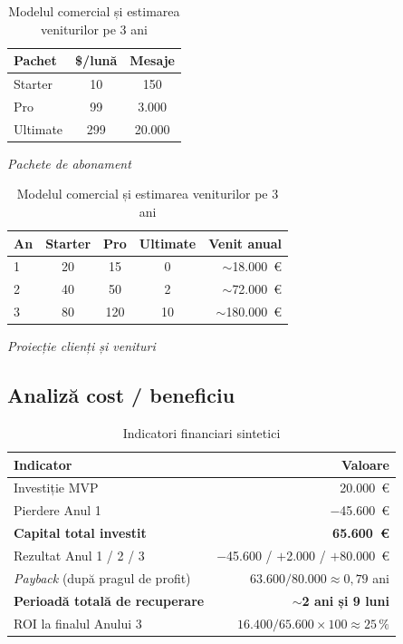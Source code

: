 \begin{table}[H]
\centering
\small
\begin{minipage}{0.42\textwidth}
\centering
\begin{tabular}{lcc}
\toprule
\textbf{Pachet}   & \textbf{\$/lună} & \textbf{Mesaje} \\
\midrule
Starter           & 10   & 150 \\
Pro               & 99   & 3.000 \\
Ultimate          & 299  & 20.000 \\
\bottomrule
\end{tabular}
\par\smallskip\textit{Pachete de abonament}
\end{minipage}\hfill
\begin{minipage}{0.55\textwidth}
\centering
\begin{tabular}{lcccr}
\toprule
\textbf{An} & \textbf{Starter} & \textbf{Pro} & \textbf{Ultimate} & \textbf{Venit anual} \\
\midrule
1 & 20  & 15  &  0 & $\sim$18.000~\euro \\
2 & 40  & 50  &  2 & $\sim$72.000~\euro \\
3 & 80  & 120 & 10 & $\sim$180.000~\euro \\
\bottomrule
\end{tabular}
\par\smallskip\textit{Proiecție clienți și venituri}
\end{minipage}
\caption{Modelul comercial și estimarea veniturilor pe 3 ani}
\label{tab:venituri}
\end{table}

\subsection{Analiză cost / beneficiu}

\begin{table}[H]
\centering
\small
\begin{tabular}{lr}
\toprule
\textbf{Indicator} & \textbf{Valoare} \\
\midrule
Investiție MVP                          & 20.000~\euro \\
Pierdere Anul 1                         & $-$45.600~\euro \\
\textbf{Capital total investit}         & \textbf{65.600~\euro} \\
\midrule
Rezultat Anul 1 / 2 / 3                 & $-$45.600 / $+$2.000 / $+$80.000~\euro \\
\textit{Payback} (după pragul de profit) & $63.600 / 80.000 \approx 0{,}79$ ani \\
\textbf{Perioadă totală de recuperare}  & \textbf{$\sim$2 ani și 9 luni} \\
ROI la finalul Anului 3                 & $16.400 / 65.600 \times 100 \approx 25\,\%$ \\
\bottomrule
\end{tabular}
\caption{Indicatori financiari sintetici}
\label{tab:roi}
\end{table}
